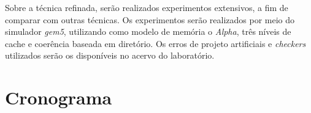 \documentclass{ufsc-thesis} %
\begin{document}
Sobre a técnica refinada, serão realizados experimentos extensivos, a fim de comparar com
outras técnicas. Os experimentos serão realizados por meio do simulador \textit{gem5},
utilizando como modelo de memória o \textit{Alpha}, três níveis de cache e coerência baseada em
diretório. Os erros de projeto artificiais e \textit{checkers} utilizados serão os disponíveis
no acervo do laboratório.

\chapter{Cronograma}
    \noindent\resizebox{\textwidth}{!}{

}
\end{document}
